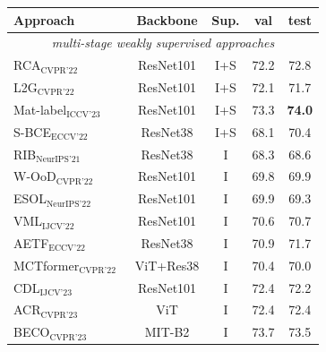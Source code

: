 \begin{table}[!t]
    \centering
    \renewcommand{\arraystretch}{1.2}
    \setlength{\tabcolsep}{6pt}
    \begin{tabular}{l c c c c}
        \hline
        \textbf{Approach}                                                               & \textbf{Backbone}   & \textbf{Sup.} & \textbf{val}           & \textbf{test}          \\
        \hline
        \multicolumn{5}{c}{\textit{multi-stage weakly supervised approaches}}                                                    \\
        RCA$_{\text{CVPR'22}}$~\cite{wsss_RCA}             & ResNet101  & I+S  & 72.2          & 72.8          \\
        L2G$_{\text{CVPR'22}}$~\cite{wsss_L2G}             & ResNet101  & I+S  & 72.1          & 71.7          \\
        Mat-label$_{\text{ICCV'23}}$~\cite{wsss_MatLabel}  & ResNet101  & I+S  & 73.3          & \textbf{74.0} \\
        S-BCE$_{\text{ECCV'22}}$~\cite{wsss_s_bce}         & ResNet38   & I+S  & 68.1          & 70.4          \\
        RIB$_{\text{NeurIPS'21}}$~\cite{wsss_rib}          & ResNet38   & I    & 68.3          & 68.6          \\
        W-OoD$_{\text{CVPR'22}}$~\cite{wsss_ood}      & ResNet101  & I    & 69.8          & 69.9          \\
        ESOL$_{\text{NeurIPS'22}}$~\cite{wsss_esol}   & ResNet101  & I    & 69.9          & 69.3          \\
        VML$_{\text{IJCV'22}}$~\cite{wsss_vml}        & ResNet101  & I    & 70.6          & 70.7          \\
        AETF$_{\text{ECCV'22}}$~\cite{wsss_aetf}      & ResNet38   & I    & 70.9          & 71.7          \\
        MCTformer$_{\text{CVPR'22}}$~\cite{wsss_MCTformer} & ViT+Res38  & I    & 70.4          & 70.0          \\
        CDL$_{\text{IJCV'23}}$~\cite{wsss_cdl}        & ResNet101  & I    & 72.4          & 72.2          \\
        ACR$_{\text{CVPR'23}}$~\cite{wsss_acr}        & ViT        & I    & 72.4          & 72.4          \\
        BECO$_{\text{CVPR'23}}$~\cite{wsss_beco}      & MIT-B2     & I    & 73.7          & 73.5          \\

\end{tabular}
\end{table}
